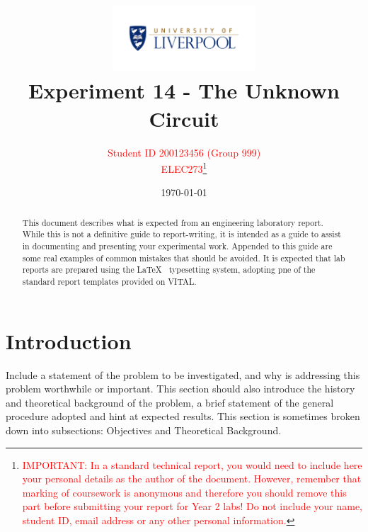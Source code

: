 \documentclass[11pt, a4paper]{article}
\title{\includegraphics[width=0.4\textwidth]{UnivCrest}
        \\Experiment 14 - The Unknown Circuit}          %
\author{\textcolor{red}{Student ID 200123456 (Group 999)}                %
        \\  \textcolor{red}{ELEC273}\footnote{\textcolor{red}{IMPORTANT: In a standard technical report, you would need to include here your personal details as the author of the document. However, remember that marking of coursework is anonymous and therefore you should remove this part before submitting your report for Year 2 labs! Do not include your name, student ID, email address or any other personal information.}}}                                    %
\date{\tiny{\today}}
\begin{document}
\begin{titlepage}
\maketitle
{} %

\begin{abstract}
This document describes what is expected from an engineering laboratory report. While this is not a definitive guide to report-writing, it is intended as a guide to assist in documenting and presenting your experimental work. Appended to this guide are some real examples of common mistakes that should be avoided. It is expected that lab reports are prepared using the \LaTeX~ typesetting system, adopting pne of the standard report templates provided on VITAL. 
\end{abstract}


\tableofcontents
\end{titlepage}


\section{Introduction}


Include a statement of the problem to be investigated, and why is addressing this problem worthwhile or important. This section should also introduce the history and theoretical background of the problem, a brief statement of the general procedure adopted and hint at expected results. This section is sometimes broken down into subsections: Objectives and Theoretical Background.

\end{document}
